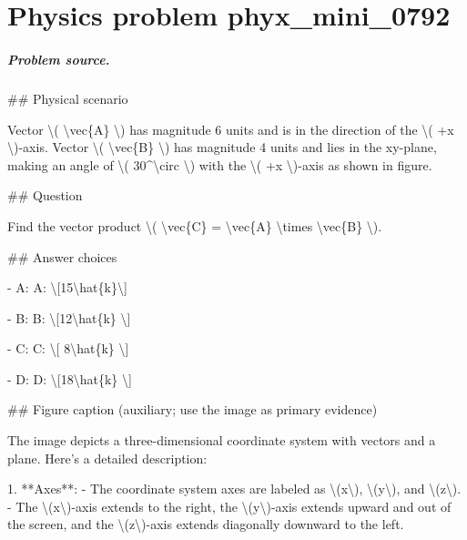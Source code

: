 
\chapter{Physics problem phyx\_mini\_0792}
\label{ch:PhyXMiniProblems_problem_phyx_mini_0792}

\paragraph{Problem source.}
\#\# Physical scenario

Vector \textbackslash{}( \textbackslash{}vec\{A\} \textbackslash{}) has magnitude 6 units and is in the direction of the \textbackslash{}( +x \textbackslash{})-axis. Vector \textbackslash{}( \textbackslash{}vec\{B\} \textbackslash{}) has magnitude 4 units and lies in the xy-plane, making an angle of \textbackslash{}( 30\textasciicircum{}\textbackslash{}circ \textbackslash{}) with the \textbackslash{}( +x \textbackslash{})-axis as shown in figure.

\#\# Question

Find the vector product \textbackslash{}( \textbackslash{}vec\{C\} = \textbackslash{}vec\{A\} \textbackslash{}times \textbackslash{}vec\{B\} \textbackslash{}).

\#\# Answer choices

- A: A: \textbackslash{}[15\textbackslash{}hat\{k\}\textbackslash{}]

- B: B: \textbackslash{}[12\textbackslash{}hat\{k\} \textbackslash{}]

- C: C: \textbackslash{}[ 8\textbackslash{}hat\{k\} \textbackslash{}]

- D: D: \textbackslash{}[18\textbackslash{}hat\{k\} \textbackslash{}]

\#\# Figure caption (auxiliary; use the image as primary evidence)

The image depicts a three-dimensional coordinate system with vectors and a plane. Here's a detailed description:

1. **Axes**:
   - The coordinate system axes are labeled as \textbackslash{}(x\textbackslash{}), \textbackslash{}(y\textbackslash{}), and \textbackslash{}(z\textbackslash{}).
   - The \textbackslash{}(x\textbackslash{})-axis extends to the right, the \textbackslash{}(y\textbackslash{})-axis extends upward and out of the screen, and the \textbackslash{}(z\textbackslash{})-axis extends diagonally downward to the left.

